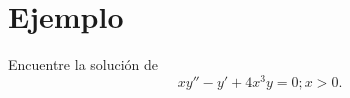 


    

    \section{Ejemplo}
    Encuentre la solución de  \[
    xy'' - y' + 4x^{3}y = 0; x>0
    .\] 

